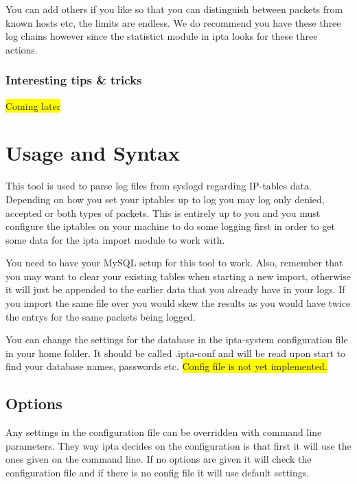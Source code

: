 \documentclass[english,twoside,openright,a4paper,12pt]{article}
\newcommand{\hilight}[1]{\colorbox{yellow}{#1}}
\begin{document}
You can add others if you like so that you can distinguish between
packets from known hosts etc, the limits are endless. We do recommend
you have these three log chains however since the statistict module in
ipta looks for these three actions.

\subsubsection{Interesting tips \& tricks}

\hilight{Coming later}


\section{Usage and Syntax}

This tool is used to parse log files from syslogd regarding IP-tables
data. Depending on how you set your iptables up to log you may log
only denied, accepted or both types of packets. This is entirely up to
you and you must configure the iptables on your machine to do some
logging first in order to get some data for the ipta import module to
work with.
 
You need to have your MySQL setup for this tool to work. Also,
remember that you may want to clear your existing tables when starting
a new import, otherwise it will just be appended to the earlier data
that you already have in your logs. If you import the same file over
you would skew the results as you would have twice the entrys for the
same packets being logged.
 
You can change the settings for the database in the ipta-system
configuration file in your home folder. It should be called .ipta-conf
and will be read upon start to find your database names, passwords
etc. \hilight{Config file is not yet implemented.}

\subsection{Options}

Any settings in the configuration file can be overridden with command
line parameters. They way ipta decides on the configuration is that
first it will use the ones given on the command line. If no options
are given it will check the configuration file and if there is no
config file it will use default settings.
\end{document}
